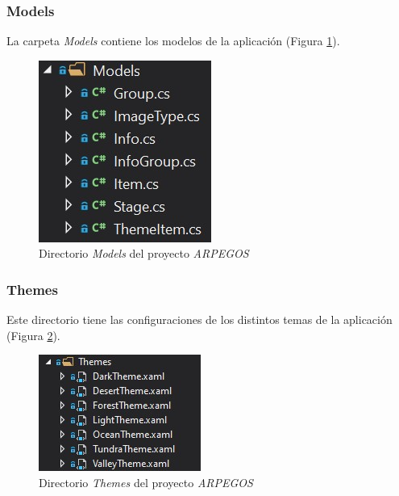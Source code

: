 {\subsubsection{Models}
La carpeta \textit{Models} contiene los modelos de la aplicación (Figura \ref*{Models}).

\begin{figure}[H]
    \centering
    \includegraphics[scale=1]{Images/ARPEGOS_Models.jpg}
    \caption{Directorio \textit{Models} del proyecto \textit{ARPEGOS}}
    \label{Models}    
\end{figure}
\subsubsection{Themes}
Este directorio tiene las configuraciones de los distintos temas
de la aplicación (Figura \ref*{Themes}).

\begin{figure}[H]
    \centering
    \includegraphics[scale=1.5]{Images/ARPEGOS_Themes.jpg}
    \caption{Directorio \textit{Themes} del proyecto \textit{ARPEGOS}}
    \label{Themes}    
\end{figure}
\newpage
}
